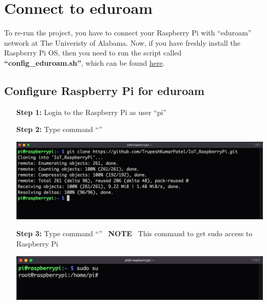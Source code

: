 \section{Connect to eduroam}	\label{sec:run-eduroam}
	 To re-run the project, you have to connect your Raspberry Pi with ``eduroam'' network at The Univeristy of Alabama. Now, if you have freshly install the Raspberry Pi OS, then you need to run the script called \textbf{``config\_eduroam.sh''}, which can be found \href{https://github.com/TrupeshKumarPatel/IoT_RaspberryPi/tree/main/source_code/eduroam_config}{here}. 
	 
	 \subsection{Configure Raspberry Pi for eduroam}
		\begin{itemize}[leftmargin=1.8cm]
			\item[\textbf{Step 1:}] Login to the Raspberry Pi as user ``pi'' %
			\item[\textbf{Step 2:}] Type command ``{\selectfont{git clone https://github.com/TrupeshKumarPatel/IoT\_RaspberryPi.git}}''\\
				\begin{minipage}{\textwidth}
					\vspace{2mm}
					\includegraphics[scale=0.35]{Images/raspberry_pi/eduroam_config/clone_git.png}
					\vspace{2mm}
				\end{minipage}
			\item[\textbf{Step 3:}] Type command ``{\selectfont{sudo su}}'' ~\danger\textbf{NOTE} ~This command to get sudo access to Raspberry Pi \danger\\
				\begin{minipage}{\textwidth}
					\vspace{2mm}
					\includegraphics[scale=0.35]{Images/raspberry_pi/eduroam_config/sudo_login.png}

\end{minipage}
\end{itemize}
